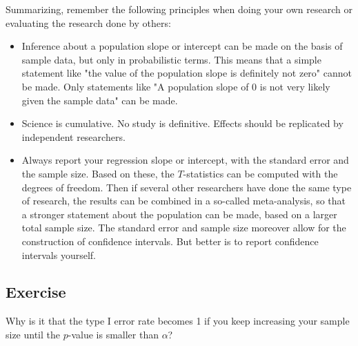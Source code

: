 \documentclass[]{book}\usepackage[]{graphicx}\usepackage[]{color}
\begin{document}
Summarizing, remember the following principles when doing your own research or evaluating the research done by others:

\begin{itemize}

\item Inference about a population slope or intercept can be made on the basis of sample data, but only in probabilistic terms. This means that a simple statement like "the value of the population slope is definitely not zero" cannot be made. Only statements like "A population slope of 0 is not very likely given the sample data" can be made.

\item Science is cumulative. No study is definitive. Effects should be replicated by independent researchers.

\item Always report your regression slope or intercept, with the standard error and the sample size. Based on these, the $T$-statistics can be computed with the degrees of freedom. Then if several other researchers have done the same type of research, the results can be combined in a so-called meta-analysis, so that a stronger statement about the population can be made, based on a larger total sample size. The standard error and sample size moreover allow for the construction of confidence intervals. But better is to report confidence intervals yourself.

\end{itemize}



\subsection{Exercise}

Why is it that the type I error rate becomes 1 if you keep increasing your sample size until the $p$-value is smaller than $\alpha$?
\end{document}
